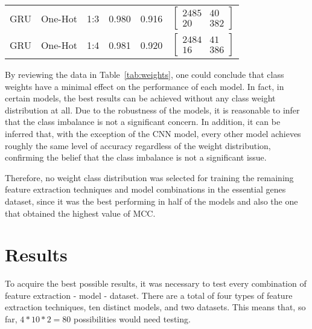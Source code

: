\begin{table}[ht]
\begin{tabular}{llllll}
        GRU & One-Hot & 1:3 & 0.980 & 0.916 & 
    	$\begin{bmatrix}
            2485 & 40\\ 
            20 & 382
        \end{bmatrix}$
        \\
        
        GRU & One-Hot & 1:4 & 0.981 & 0.920 & 
    	$\begin{bmatrix}
            2484 & 41\\ 
            16 & 386
        \end{bmatrix}$
        \\
        
    	\bottomrule
    \end{tabular}
\end{table}

By reviewing the data in Table~\ref{tab:weights}, one could conclude that class weights have a minimal effect on the performance of each model. In fact, in certain models, the best results can be achieved without any class weight distribution at all. Due to the robustness of the models, it is reasonable to infer that the class imbalance is not a significant concern. In addition, it can be inferred that, with the exception of the \gls{CNN} model, every other model achieves roughly the same level of accuracy regardless of the weight distribution, confirming the belief that the class imbalance is not a significant issue.

Therefore, no weight class distribution was selected for training the remaining feature extraction techniques and model combinations in the essential genes dataset, since it was the best performing in half of the models and also the one that obtained the highest value of MCC.


\section{Results}\label{lab:results}

To acquire the best possible results, it was necessary to test every combination of feature extraction - model - dataset. There are a total of four types of feature extraction techniques, ten distinct models, and two datasets. This means that, so far, $4*10*2 = 80$ possibilities would need testing. 

